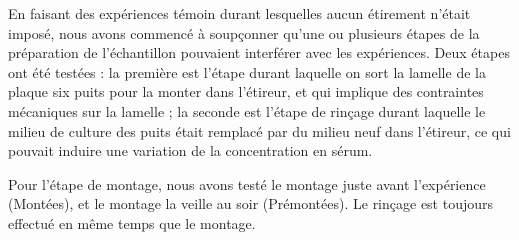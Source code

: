 En faisant des expériences témoin durant lesquelles aucun étirement n'était imposé, nous avons commencé à soupçonner qu'une ou plusieurs étapes de la préparation de l'échantillon pouvaient interférer avec les expériences. 
Deux étapes ont été testées : la première est l'étape durant laquelle on sort la lamelle de la plaque six puits pour la monter dans l'étireur, et qui implique des contraintes mécaniques sur la lamelle ; la seconde est l'étape de rinçage durant laquelle le milieu de culture des puits était remplacé par du milieu neuf dans l'étireur, ce qui pouvait induire une variation de la concentration en sérum. 

Pour l'étape de montage, nous avons testé le montage juste avant l'expérience (Montées), et le montage la veille au soir (Prémontées). 
Le rinçage est toujours effectué en même temps que le montage. 




